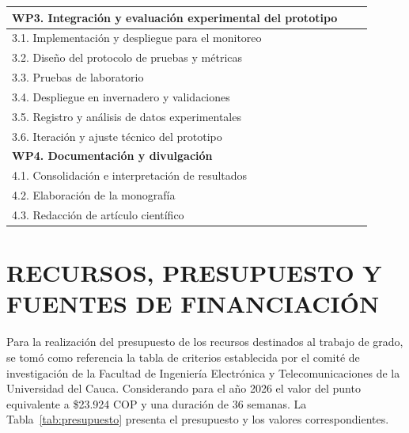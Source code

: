 \documentclass[12pt,letterpaper]{article}
\begin{document}
\begin{table}[H]
{\begin{tabular}{|p{5.5cm}|c|c|c|c|c|c|c|c|c|}
\hline
\multicolumn{10}{|l|}{\textbf{WP3. Integración y evaluación experimental del prototipo}} \\
\hline
3.1. Implementación y despliegue para el monitoreo & & \cellcolor{yellow!50} & \cellcolor{yellow!50} & \cellcolor{yellow!50} & & & & & \\
\hline
3.2. Diseño del protocolo de pruebas y métricas & & \cellcolor{yellow!50} & \cellcolor{yellow!50} & & & & & & \\
\hline
3.3. Pruebas de laboratorio & & & & \cellcolor{yellow!50} & \cellcolor{yellow!50} & & & & \\
\hline
3.4. Despliegue en invernadero y validaciones & & & & & & \cellcolor{yellow!50} & \cellcolor{yellow!50} & & \\
\hline
3.5. Registro y análisis de datos experimentales & & & & & & & \cellcolor{yellow!50} & \cellcolor{yellow!50} & \\
\hline
3.6. Iteración y ajuste técnico del prototipo & & & & & & & & \cellcolor{yellow!50} & \cellcolor{yellow!50} \\
\hline
\multicolumn{10}{|l|}{\textbf{WP4. Documentación y divulgación}} \\
\hline
4.1. Consolidación e interpretación de resultados & & & & & & & & \cellcolor{red!25} & \cellcolor{red!25} \\
\hline
4.2. Elaboración de la monografía & \cellcolor{red!25} & \cellcolor{red!25} & \cellcolor{red!25} & \cellcolor{red!25} & \cellcolor{red!25} & \cellcolor{red!25} & \cellcolor{red!25} & \cellcolor{red!25} & \cellcolor{red!25} \\
\hline
4.3. Redacción de artículo científico & & & & & & & & \cellcolor{red!25} & \cellcolor{red!25} \\
\hline
\end{tabular}
}
\end{table}

\vspace{0.5cm}


\section{RECURSOS, PRESUPUESTO Y FUENTES DE FINANCIACIÓN}

Para la realización del presupuesto de los recursos destinados al trabajo de grado, se tomó como referencia la tabla de criterios establecida por el comité de investigación de la Facultad de Ingeniería Electrónica y Telecomunicaciones de la Universidad del Cauca. Considerando para el año 2026 el valor del punto equivalente a \$23.924 COP y una duración de 36 semanas. La Tabla~\ref{tab:presupuesto} presenta el presupuesto y los valores correspondientes.
\end{document}
